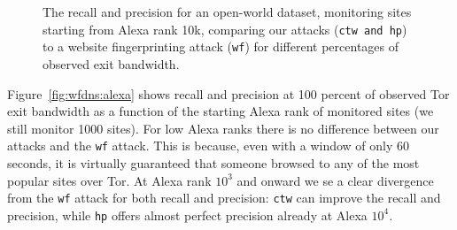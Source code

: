 \begin{figure}[t]
\centering
{}
\caption{The recall and precision for an open-world dataset, monitoring sites
starting from Alexa rank 10k, comparing our attacks (\texttt{ctw and
 \texttt{hp}}) to a website fingerprinting attack (\texttt{wf}) for different
 percentages of observed exit bandwidth. }
\label{fig:wfdns:torpct}
\end{figure}


Figure~\ref{fig:wfdns:alexa} shows recall and precision at 100 percent of
observed Tor exit bandwidth as a function of the starting Alexa rank of
monitored sites (we still monitor 1000 sites).
For low Alexa ranks there is no difference between our attacks and the
\texttt{wf} attack. This is because, even with a window of only 60 seconds,
it is virtually guaranteed that someone browsed to any of the most popular
sites over Tor. At Alexa rank $10^3$ and onward we se a clear divergence from
the \texttt{wf} attack for both recall and precision:
\texttt{ctw} can improve the recall and precision, while
\texttt{hp} offers almost perfect precision already at Alexa $10^4$.

